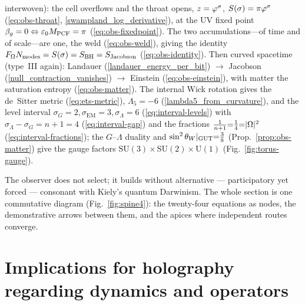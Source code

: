 \begin{description}
        interwoven): the cell overflows and the throat opens, $z=\varphi^\sigma$,
        $S(\sigma)=\pi\varphi^\sigma$ (\eqref{eq:obs-throat}, \eqref{swampland_log_derivative}), at the UV
        fixed point $\beta_g=0\Leftrightarrow\varepsilon_{0}M_{\mathrm{PCF}}=\pi$ (\eqref{eq:obs-fixedpoint}). The two
        accumulations---of time and of scale---are one, the weld (\eqref{eq:obs-weld}), giving the
        identity $F_\Omega N_{\mathrm{modes}}=S(\sigma)=S_{\mathrm{BH}}=S_{\text{Jacobson}}$ (\eqref{eq:obs-identity}). Then
        curved spacetime (type~III again): Landauer (\eqref{landauer_energy_per_bit}) $\to$ Jacobson
        (\eqref{null_contraction_vanishes}) $\to$ Einstein (\eqref{eq:obs-einstein}), with matter the
        saturation entropy (\eqref{eq:obs-matter}). The internal Wick rotation gives the de~Sitter
        metric (\eqref{eq:ets-metric}), $\Lambda_5={-}6$ (\eqref{lambda5_from_curvature}), and the
        level interval $\sigma_G{=}2,\sigma_{\mathrm{EM}}{=}3,\sigma_\Lambda{=}6$
        (\eqref{eq:interval-levels}) with $\sigma_\Lambda{-}\sigma_G{=}n{+}1{=}4$
        (\eqref{eq:interval-gap}) and the fractions $\tfrac1{n+1}{=}\tfrac14{=}|\Omega|^2$
        (\eqref{eq:interval-fractions}); the $G$--$\Lambda$ duality and
        $\sin^2\theta_W|_{\rm GUT}{=}\tfrac38$ (Prop.~\ref{prop:obs-matter}) give the gauge factors
        $\mathrm{SU}(3){\times}\mathrm{SU}(2){\times}\mathrm{U}(1)$ (Fig.~\ref{fig:torus-gauge}).
\end{description}
\noindent The observer does not select; it builds without alternative --- participatory yet
forced --- consonant with Kiely's quantum Darwinism. The whole section is one commutative
diagram (Fig.~\ref{fig:spine4}): the twenty-four equations as nodes, the demonstrative
arrows between them, and the apices where independent routes converge.

\FloatBarrier
\section{Implications for holography regarding dynamics and operators}\label{sec:dof}

